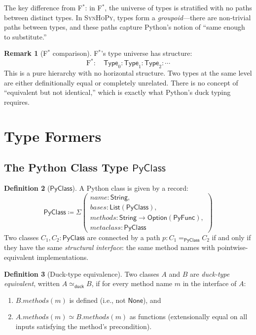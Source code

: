 \documentclass[11pt,a4paper]{report}
\theoremstyle{definition}
\newtheorem{definition}{Definition}[chapter]
\newtheorem{remark}[definition]{Remark}
\theoremstyle{plain}
\newcommand{\Type}{\mathsf{Type}}
\newcommand{\PyClass}{\mathsf{PyClass}}
\newcommand{\PyFunc}{\mathsf{PyFunc}}
\newcommand{\defeq}{\coloneqq}
\newcommand{\fstar}{F$^{*}$}
\newcommand{\synhopy}{\textsc{SynHoPy}}
\begin{document}
The key difference from \fstar{}: in \fstar{}, the universe of types is
stratified with no paths between distinct types. In \synhopy{}, types form a
\emph{groupoid}---there are non-trivial paths between types, and these paths
capture Python's notion of ``same enough to substitute.''

\begin{remark}[\fstar{} comparison]
\fstar{}'s type universe has structure:
\[
  \text{F}^{*}: \quad \Type_0 : \Type_1 : \Type_2 : \cdots
\]
This is a pure hierarchy with no horizontal structure. Two types at the same level
are either definitionally equal or completely unrelated. There is no concept of
``equivalent but not identical,'' which is exactly what Python's duck typing requires.
\end{remark}

\section{Type Formers}

\subsection{The Python Class Type $\PyClass$}

\begin{definition}[$\PyClass$]
A Python class is given by a record:
\[
  \PyClass \defeq \Sigma\left(
    \begin{array}{l}
      \mathit{name} : \mathsf{String}, \\
      \mathit{bases} : \mathsf{List}(\PyClass), \\
      \mathit{methods} : \mathsf{String} \to \mathsf{Option}(\PyFunc), \\
      \mathit{metaclass} : \PyClass
    \end{array}
  \right)
\]
Two classes $C_1, C_2 : \PyClass$ are connected by a path $p : C_1 =_{\PyClass} C_2$
if and only if they have the same \emph{structural interface}: the same method
names with pointwise-equivalent implementations.
\end{definition}

\begin{definition}[Duck-type equivalence]
\label{def:duck-eq}
Two classes $A$ and $B$ are \emph{duck-type equivalent}, written $A \simeq_{\mathsf{duck}} B$,
if for every method name $m$ in the interface of $A$:
\begin{enumerate}
  \item $B.\mathit{methods}(m)$ is defined (i.e., not $\mathsf{None}$), and
  \item $A.\mathit{methods}(m) \simeq B.\mathit{methods}(m)$ as functions
    (extensionally equal on all inputs satisfying the method's precondition).
\end{enumerate}
\end{definition}
\end{document}
